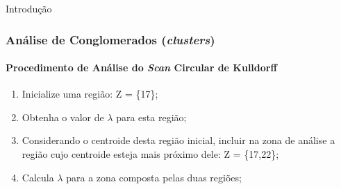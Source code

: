 \documentclass[aspectratio=169]{beamer}
\begin{document}
\begin{frame}{Introdução}
\frametitle{Análise de Conglomerados (\textit{clusters})}
\framesubtitle{Procedimento de Análise do \textit{Scan} Circular de Kulldorff}

\fboxsep=0pt
\noindent
\begin{minipage}[t]{0.48\linewidth}
\begin{enumerate}
\item Inicialize uma região: Z = \{17\};
\item Obtenha o valor de $\lambda$ para esta região;
\item Considerando o centroide desta região inicial, incluir na zona de análise a região cujo centroide esteja mais próximo dele: Z = \{17,22\};
\item Calcula $\lambda$ para a zona composta pelas duas regiões;
\end{enumerate}

\end{minipage}
\hfill%


\end{frame}
\end{document}
